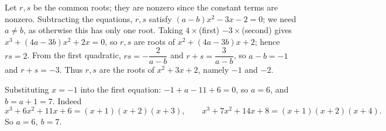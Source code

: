 Let $r,s$ be the common roots; they are nonzero since the constant terms are nonzero. Subtracting the equations, $r,s$ satisfy $(a-b)x^2-3x-2=0$; we need $a\ne b$, as otherwise this has only one root. Taking $4\times$(first) $-3\times$(second) gives $x^3+(4a-3b)x^2+2x=0$, so $r,s$ are roots of $x^2+(4a-3b)x+2$; hence $rs=2$. From the first quadratic, $rs=-\dfrac{2}{a-b}$ and $r+s=\dfrac{3}{a-b}$, so $a-b=-1$ and $r+s=-3$. Thus $r,s$ are the roots of $x^2+3x+2$, namely $-1$ and $-2$.

Substituting $x=-1$ into the first equation: $-1+a-11+6=0$, so $a=6$, and $b=a+1=7$. Indeed
\[x^3+6x^2+11x+6=(x+1)(x+2)(x+3),\qquad x^3+7x^2+14x+8=(x+1)(x+2)(x+4).\]
So $\boxed{a=6,\ b=7}$.
